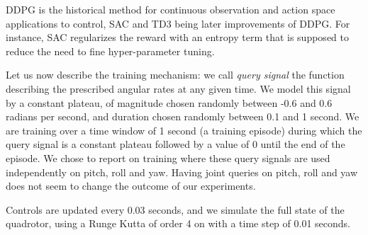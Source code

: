\documentclass[anonymous=true,format=sigconf, screen=true, review=false]{acmart}
\begin{document}

DDPG is the historical method for continuous observation and action space applications to control, SAC and TD3 being later improvements of DDPG. For instance, 
SAC regularizes the reward with an entropy term that is supposed to reduce the need to fine hyper-parameter tuning. 

Let us now describe the training mechanism: we call {\it query signal} the function describing the prescribed angular rates at any given time. %
We model this signal by a constant plateau, of magnitude chosen randomly between -0.6 and 0.6 radians per second, and duration chosen randomly between 0.1 and 1 second. We are training over a time window of 1 second (a training episode) during which the query signal is a constant plateau followed by a value of 0 until the end of the episode.
We chose to report on training where these query signals are used independently on pitch, roll and yaw. Having joint queries on pitch, roll and yaw does not seem to change the outcome of our experiments. 

Controls are updated every 0.03 seconds, and we simulate the full state of the quadrotor, using a Runge Kutta of order 4 on  with a time step of 0.01 seconds. 

\end{document}
